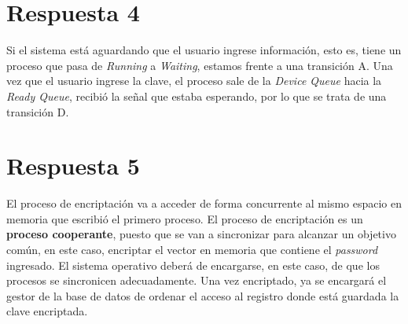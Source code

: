 \documentclass[11pt]{article}
\begin{document}
\section*{Respuesta 4}

Si el sistema está aguardando que el usuario ingrese información, esto es, tiene 
un proceso que pasa de \emph{Running} a \emph{Waiting}, estamos frente a una
transición A. Una vez que el usuario ingrese la clave, el proceso sale de la 
\emph{Device Queue} hacia la \emph{Ready Queue}, recibió la señal que estaba 
esperando, por lo que se trata de una transición D.

\section*{Respuesta 5}

El proceso de encriptación va a acceder de forma concurrente al mismo espacio en 
memoria que escribió el primero proceso. El proceso de encriptación es un 
\textbf{proceso cooperante}, puesto que se van a sincronizar para alcanzar un 
objetivo común, en este caso, encriptar el vector en memoria que contiene el
\emph{password} ingresado. El sistema operativo deberá de encargarse, en este
caso, de que los procesos se sincronicen adecuadamente. Una vez encriptado, ya
se encargará el gestor de la base de datos de ordenar el acceso al registro
donde está guardada la clave encriptada.
\end{document}
